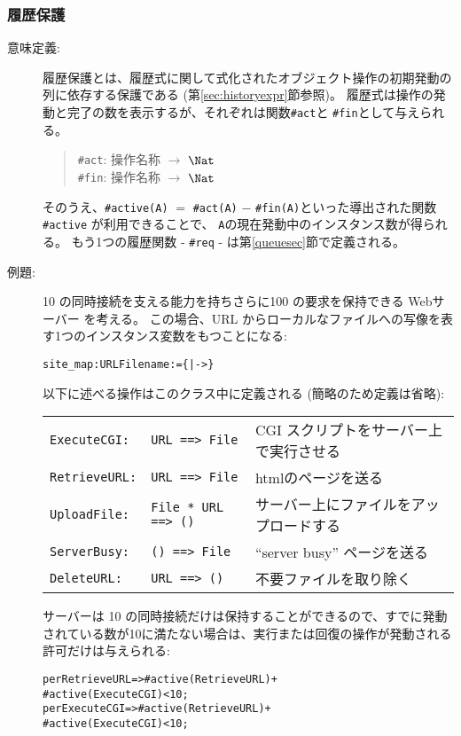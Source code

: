 \documentclass[\pformat,12pt]{jarticle}
\begin{document}
\subsubsection{履歴保護}
\begin{description}
\item[意味定義:] 履歴保護とは、履歴式に関して式化されたオブジェクト操作の初期発動の列に依存する保護である (第\ref{sec:historyexpr}節参照)。
履歴式は操作の発動と完了の数を表示するが、それぞれは関数{\tt \#act}と {\tt \#fin}として与えられる。 

\begin{quote}
{\tt \#act}: 操作名称 $\rightarrow$ $\Nat$ \\
{\tt \#fin}: 操作名称 $\rightarrow$ $\Nat$ 
\end{quote}

そのうえ、{\tt \#active(}{\tt A}{\tt )} $=$ {\tt \#act(}{\tt A}{\tt )} $-$
{\tt \#fin(}{\tt A}{\tt )}といった導出された関数 {\tt \#active} が利用できることで、 {\tt A}の現在発動中のインスタンス数が得られる。 
もう1つの履歴関数 - \texttt{\#req} - は第\ref{queuesec}節で定義される。
\item[例題:]
10 の同時接続を支える能力を持ちさらに100 の要求を保持できる Webサーバー\label{example:webserver} を考える。 
この場合、URL からローカルなファイルへの写像を表す1つのインスタンス変数をもつことになる:
\begin{alltt}
    site_map :  URL  Filename := \{|->\}
\end{alltt}

以下に述べる操作はこのクラス中に定義される (簡略のため定義は省略):

\begin{tabular}{lll}
\texttt{ExecuteCGI:} & \texttt{URL ==> File} &  CGI スクリプトをサーバー上で実行させる\\
\texttt{RetrieveURL:} & \texttt{URL ==> File} & htmlのページを送る\\
\texttt{UploadFile:} & \texttt{File * URL ==> ()} & サーバー上にファイルをアップロードする\\
\texttt{ServerBusy:} & \texttt{() ==> File} & ``server busy'' ページを送る\\
\texttt{DeleteURL:} & \texttt{URL ==> ()} & 不要ファイルを取り除く\\
\end{tabular}

サーバーは 10 の同時接続だけは保持することができるので、すでに発動されている数が10に満たない場合は、実行または回復の操作が発動される許可だけは与えられる:
\begin{alltt}
    per RetrieveURL => #active(RetrieveURL) +
                       #active(ExecuteCGI) < 10;
    per ExecuteCGI  => #active(RetrieveURL) +
                       #active(ExecuteCGI) < 10;
\end{alltt}

\end{description}
\end{document}

